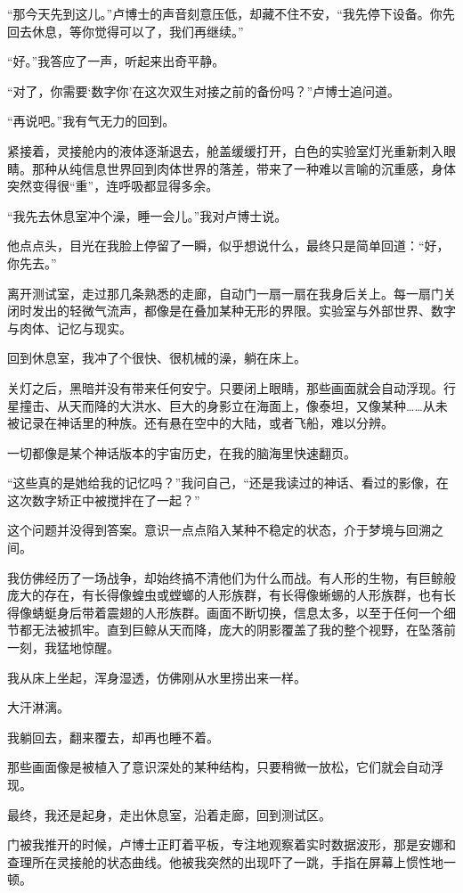 “那今天先到这儿。”卢博士的声音刻意压低，却藏不住不安，“我先停下设备。你先回去休息，等你觉得可以了，我们再继续。”

“好。”我答应了一声，听起来出奇平静。

“对了，你需要‘数字你’在这次双生对接之前的备份吗？”卢博士追问道。

“再说吧。”我有气无力的回到。

紧接着，灵接舱内的液体逐渐退去，舱盖缓缓打开，白色的实验室灯光重新刺入眼睛。那种从纯信息世界回到肉体世界的落差，带来了一种难以言喻的沉重感，身体突然变得很“重”，连呼吸都显得多余。

“我先去休息室冲个澡，睡一会儿。”我对卢博士说。

他点点头，目光在我脸上停留了一瞬，似乎想说什么，最终只是简单回道：“好，你先去。”

离开测试室，走过那几条熟悉的走廊，自动门一扇一扇在我身后关上。每一扇门关闭时发出的轻微气流声，都像是在叠加某种无形的界限。实验室与外部世界、数字与肉体、记忆与现实。

回到休息室，我冲了个很快、很机械的澡，躺在床上。

关灯之后，黑暗并没有带来任何安宁。只要闭上眼睛，那些画面就会自动浮现。行星撞击、从天而降的大洪水、巨大的身影立在海面上，像泰坦，又像某种……从未被记录在神话里的种族。还有悬在空中的大陆，或者飞船，难以分辨。

一切都像是某个神话版本的宇宙历史，在我的脑海里快速翻页。

“这些真的是她给我的记忆吗？”我问自己，“还是我读过的神话、看过的影像，在这次数字矫正中被搅拌在了一起？”

这个问题并没得到答案。意识一点点陷入某种不稳定的状态，介于梦境与回溯之间。

我仿佛经历了一场战争，却始终搞不清他们为什么而战。有人形的生物，有巨鲸般庞大的存在，有长得像蝗虫或螳螂的人形族群，有长得像蜥蜴的人形族群，也有长得像蜻蜓身后带着震翅的人形族群。画面不断切换，信息太多，以至于任何一个细节都无法被抓牢。直到巨鲸从天而降，庞大的阴影覆盖了我的整个视野，在坠落前一刻，我猛地惊醒。

我从床上坐起，浑身湿透，仿佛刚从水里捞出来一样。

大汗淋漓。

我躺回去，翻来覆去，却再也睡不着。

那些画面像是被植入了意识深处的某种结构，只要稍微一放松，它们就会自动浮现。

最终，我还是起身，走出休息室，沿着走廊，回到测试区。

门被我推开的时候，卢博士正盯着平板，专注地观察着实时数据波形，那是安娜和查理所在灵接舱的状态曲线。他被我突然的出现吓了一跳，手指在屏幕上惯性地一顿。

